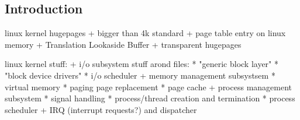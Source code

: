 
\subsection{Introduction}



linux kernel hugepages
+ bigger than 4k standard
+ page table entry on linux memory
+ Translation Lookaside Buffer
+ transparent hugepages


linux kernel stuff:
+ i/o subsystem stuff arond files:
  * "generic block layer"
  * "block device drivers"
  * i/o scheduler
+ memory management subsystsem
  * virtual memory
  * paging page replacement
  * page cache
+ process management subsystem
  * signal handling
  * process/thread creation and termination
  * process scheduler
+ IRQ (interrupt requests?) and dispatcher

